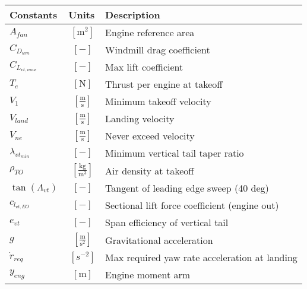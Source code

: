% 

{\footnotesize
\begin{supertabular}{lcl}
\toprule
Constants & Units & Description \\ \midrule
$A_{fan}$ & $~\mathrm{[m^{2}]}$ & Engine reference area \\
$C_{D_{wm}}$ & $~[-]$ & Windmill drag coefficient \\
$C_{L_{vt,max}}$ & $~[-]$ & Max lift coefficient \\
$T_e$ & $~\mathrm{[N]}$ & Thrust per engine at takeoff \\
$V_1$ & $~\mathrm{[\tfrac{m}{s}]}$ & Minimum takeoff velocity \\
$V_{land}$ & $~\mathrm{[\tfrac{m}{s}]}$ & Landing velocity \\
$V_{ne}$ & $~\mathrm{[\tfrac{m}{s}]}$ & Never exceed velocity \\
$\lambda_{vt_{min}}$ & $~[-]$ & Minimum vertical tail taper ratio \\
$\rho_{TO}$ & $~\mathrm{[\tfrac{kg}{m^{3}}]}$ & Air density at takeoff \\
$\tan(\Lambda_{vt})$ & $~[-]$ & Tangent of leading edge sweep (40 deg) \\
$c_{l_{vt,EO}}$ & $~[-]$ & Sectional lift force coefficient (engine out) \\
$e_{vt}$ & $~[-]$ & Span efficiency of vertical tail \\
$g$ & $~\mathrm{[\tfrac{m}{s^{2}}]}$ & Gravitational acceleration \\
$\dot{r}_{req}$ & $~[s^{-2}]$ & Max required yaw rate acceleration at landing\\
$y_{eng}$ & $~\mathrm{[m]}$ & Engine moment arm \\
\bottomrule
\end{supertabular}}

% 
